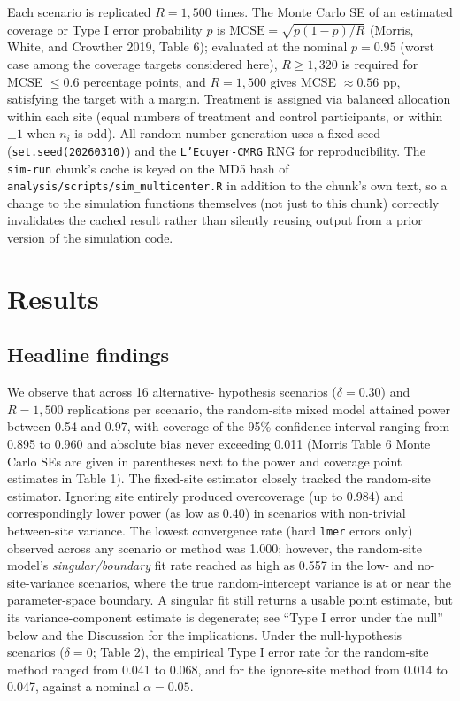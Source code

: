 \documentclass[
  11pt,
]{article}
\begin{document}
Each scenario is replicated \(R = 1{,}500\) times. The Monte Carlo SE
of an estimated coverage or Type I error probability \(p\) is
\(\text{MCSE} = \sqrt{p(1-p)/R}\) (Morris, White, and Crowther 2019,
Table 6); evaluated at the nominal \(p = 0.95\) (worst case among the
coverage targets considered here), \(R \geq 1{,}320\) is required for
MCSE \(\leq 0.6\) percentage points, and \(R = 1{,}500\) gives
MCSE \(\approx 0.56\) pp, satisfying the target with a margin.
Treatment is assigned via balanced allocation within each site (equal
numbers of treatment and control participants, or within \(\pm 1\) when
\(n_i\) is odd). All random number generation uses a fixed seed
(\texttt{set.seed(20260310)}) and the \texttt{L'Ecuyer-CMRG} RNG
for reproducibility. The \texttt{sim-run} chunk's cache is keyed on the MD5
hash of \texttt{analysis/scripts/sim\_multicenter.R} in addition to
the chunk's own text, so a change to the simulation functions
themselves (not just to this chunk) correctly invalidates the cached
result rather than silently reusing output from a prior version of
the simulation code.

\section{Results}\label{results}

\subsection{Headline findings}\label{headline-findings}

We observe that across 16 alternative-
hypothesis scenarios (\(\delta = 0.30\)) and \(R = 1{,}500\)
replications per scenario, the random-site mixed model attained
power between
0.54 and
0.97, with coverage of
the 95\% confidence interval ranging from
0.895 to
0.960 and absolute bias
never exceeding
0.011
(Morris Table 6 Monte Carlo SEs are given in parentheses next to
the power and coverage point estimates in Table 1). The fixed-site
estimator closely
tracked the random-site estimator. Ignoring site entirely produced
overcoverage (up to
0.984) and correspondingly
lower power (as low as
0.40) in scenarios with
non-trivial between-site variance. The lowest convergence rate
(hard \texttt{lmer} errors only) observed across any scenario or
method was 1.000; however, the
random-site model's \emph{singular/boundary} fit rate reached as high as
0.557
in the low- and no-site-variance scenarios, where the true
random-intercept variance is at or near the parameter-space
boundary. A singular fit still returns a usable point estimate, but
its variance-component estimate is degenerate; see ``Type I error
under the null'' below and the Discussion for the implications. Under
the null-hypothesis scenarios (\(\delta = 0\); Table 2), the empirical
Type I error rate for the random-site method ranged from
0.041 to
0.068, and for the ignore-site
method from 0.014 to
0.047, against a nominal
\(\alpha = 0.05\).
\end{document}
